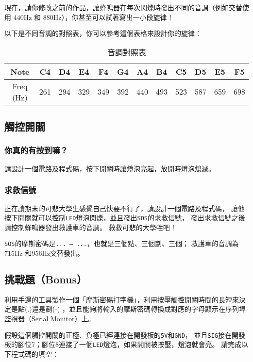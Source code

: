\documentclass[12pt,a4paper]{article}
\begin{document}
現在，請你修改之前的作品，讓蜂鳴器在每次閃爍時發出不同的音調（例如交替使用 440Hz 和 880Hz），你甚至可以試著寫出一小段旋律！

以下是不同音調的對照表，你可以參考這個表格來設計你的旋律：
\begin{table}[h!]
\centering
\begin{tabular}{|c|c|c|c|c|c|c|c|c|c|c|c|}
\hline
Note & C4 & D4 & E4 & F4 & G4 & A4 & B4 & C5 & D5 & E5 & F5 \\ \hline
Freq (Hz) & 261 & 294 & 329 & 349 & 392 & 440 & 493 & 523 & 587 & 659 & 698 \\ \hline
\end{tabular}
\caption{音調對照表}
\label{tab:freq_table}
\end{table}

\subsection{觸控開關}
\subsubsection{你真的有按到嘛？}
請設計一個電路及程式碼，按下開關時讓燈泡亮起，放開時燈泡熄滅。

\subsubsection{求救信號}
正在讀期末的可悲大學生感覺自己快要不行了，請設計一個電路及程式碼，
讓他按下開關就可以控制\texttt{LED}燈泡閃爍，並且發出\texttt{SOS}的求救信號，
發出求救信號之後請控制蜂鳴器發出救護車的音調。
救救可悲的大學牲吧！

\texttt{SOS}的摩斯密碼是\texttt{... --- ...}，也就是三個點、三個劃、三個；
救護車的音調為715Hz 和956Hz交替發出。


\subsection{挑戰題（Bonus）}

利用手邊的工具製作一個「摩斯密碼打字機」，利用按壓觸控開關時間的長短來決定是點(.)還是劃(-)
，並且能夠將輸入的摩斯密碼轉換成對應的字母顯示在序列埠監視器（Serial Monitor）上。

假設這個觸控開關的正極、負極已經連接在開發板的\texttt{5V}和\texttt{GND}，
並且\texttt{SIG}接在開發板的腳位7；腳位8連接了一個\texttt{LED}燈泡，如果開關被按壓，燈泡就會亮。
請完成以下程式碼的填空：
\end{document}
